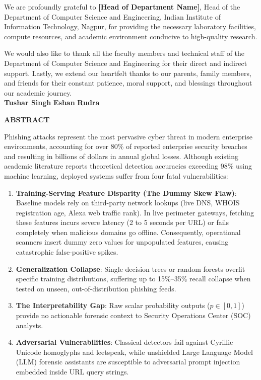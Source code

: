 \documentclass[12pt,a4paper,oneside]{report}
\begin{document}
We are profoundly grateful to \textbf{[Head of Department Name]}, Head of the Department of Computer Science and Engineering, Indian Institute of Information Technology, Nagpur, for providing the necessary laboratory facilities, compute resources, and academic environment conducive to high-quality research.

We would also like to thank all the faculty members and technical staff of the Department of Computer Science and Engineering for their direct and indirect support. Lastly, we extend our heartfelt thanks to our parents, family members, and friends for their constant patience, moral support, and blessings throughout our academic journey.\\[1.5cm]

\noindent
\textbf{Tushar Singh} \hfill \textbf{Eshan} \hfill \textbf{Rudra}

\newpage
\thispagestyle{plain}
\begin{center}
    {\LARGE \textbf{ABSTRACT}}\\[1.0cm]
\end{center}

Phishing attacks represent the most pervasive cyber threat in modern enterprise environments, accounting for over 80\% of reported enterprise security breaches and resulting in billions of dollars in annual global losses. Although existing academic literature reports theoretical detection accuracies exceeding 98\% using machine learning, deployed systems suffer from four fatal vulnerabilities:
\begin{enumerate}
    \item \textbf{Training-Serving Feature Disparity (The Dummy Skew Flaw)}: Baseline models rely on third-party network lookups (live DNS, WHOIS registration age, Alexa web traffic rank). In live perimeter gateways, fetching these features incurs severe latency (2 to 5 seconds per URL) or fails completely when malicious domains go offline. Consequently, operational scanners insert dummy zero values for unpopulated features, causing catastrophic false-positive spikes.
    \item \textbf{Generalization Collapse}: Single decision trees or random forests overfit specific training distributions, suffering up to 15\%--35\% recall collapse when tested on unseen, out-of-distribution phishing feeds.
    \item \textbf{The Interpretability Gap}: Raw scalar probability outputs ($p \in [0, 1]$) provide no actionable forensic context to Security Operations Center (SOC) analysts.
    \item \textbf{Adversarial Vulnerabilities}: Classical detectors fail against Cyrillic Unicode homoglyphs and leetspeak, while unshielded Large Language Model (LLM) forensic assistants are susceptible to adversarial prompt injection embedded inside URL query strings.
\end{enumerate}
\end{document}
